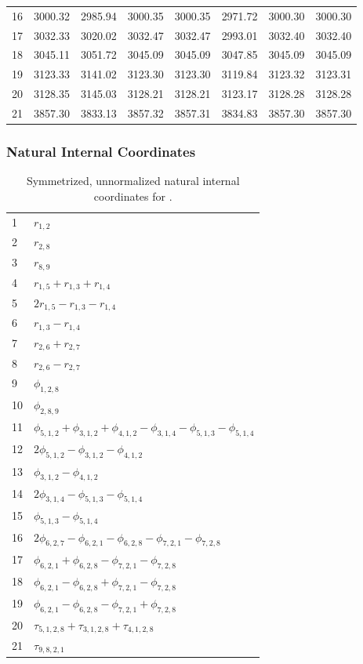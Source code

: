 \documentclass[10pt,oneside]{article}
\begin{document}
\begin{table}[h!]
\begin{tabular}{cccccccc}
16 &   3000.32 & 2985.94 & 3000.35 & 3000.35 &      2971.72 & 3000.30 & 3000.30 \\
17 &   3032.33 & 3020.02 & 3032.47 & 3032.47 &      2993.01 & 3032.40 & 3032.40 \\
18 &   3045.11 & 3051.72 & 3045.09 & 3045.09 &      3047.85 & 3045.09 & 3045.09 \\
19 &   3123.33 & 3141.02 & 3123.30 & 3123.30 &      3119.84 & 3123.32 & 3123.31 \\
20 &   3128.35 & 3145.03 & 3128.21 & 3128.21 &      3123.17 & 3128.28 & 3128.28 \\
21 &   3857.30 & 3833.13 & 3857.32 & 3857.31 &      3834.83 & 3857.30 & 3857.30 \\
\bottomrule
\end{tabular}
\end{table}

\clearpage

\subsubsection*{Natural Internal Coordinates}
\begin{table}[h!]
\centering
\caption{Symmetrized, unnormalized natural internal coordinates for .}
\small
\begin{tabular}{ll}
  1   & $r_{1,2}$ \\
  2   & $r_{2,8}$ \\
  3   & $r_{8,9}$ \\
  4   & $r_{1,5} + r_{1,3} + r_{1,4}$ \\
  5   & $2r_{1,5} - r_{1,3} - r_{1,4}$ \\
  6   & $r_{1,3} - r_{1,4}$ \\
  7   & $r_{2,6} + r_{2,7}$ \\
  8   & $r_{2,6} - r_{2,7}$ \\
  9   & $\phi_{1,2,8}$ \\
  10  & $\phi_{2,8,9}$ \\
  11  & $\phi_{5,1,2} + \phi_{3,1,2} + \phi_{4,1,2} - \phi_{3,1,4} - \phi_{5,1,3} - \phi_{5,1,4}$ \\
  12  & $2\phi_{5,1,2} - \phi_{3,1,2} - \phi_{4,1,2}$ \\
  13  & $\phi_{3,1,2} - \phi_{4,1,2}$ \\
  14  & $2\phi_{3,1,4} - \phi_{5,1,3} - \phi_{5,1,4}$ \\
  15  & $\phi_{5,1,3} - \phi_{5,1,4}$ \\
  16  & $2\phi_{6,2,7} - \phi_{6,2,1} - \phi_{6,2,8} - \phi_{7,2,1} - \phi_{7,2,8}$ \\
  17  & $\phi_{6,2,1} + \phi_{6,2,8} - \phi_{7,2,1} - \phi_{7,2,8}$ \\
  18  & $\phi_{6,2,1} - \phi_{6,2,8} + \phi_{7,2,1} - \phi_{7,2,8}$ \\
  19  & $\phi_{6,2,1} - \phi_{6,2,8} - \phi_{7,2,1} + \phi_{7,2,8}$ \\
  20  & $\tau_{5,1,2,8} + \tau_{3,1,2,8} + \tau_{4,1,2,8}$ \\
  21  & $\tau_{9,8,2,1}$ \\
\end{tabular}
\end{table}
\end{document}
